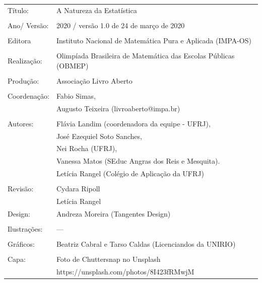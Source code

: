 \begin{tabular}{p{}p{}}
Título: & A Natureza da Estatística\\
\\
Ano/ Versão: & 2020 / versão 1.0 de 24 de março de 2020\\
\\
Editora & Instituto Nacional de Matem\'atica Pura e Aplicada (IMPA-OS)\\
\\
Realização:& Olimp\'iada Brasileira de Matem\'atica das Escolas P\'ublicas (OBMEP)\\
\\
Produção:& Associação Livro Aberto\\
\\
Coordenação: & Fabio Simas, \\
             & Augusto Teixeira (livroaberto@impa.br)\\
\\
  Autores: & Flávia Landim (coordenadora da equipe - UFRJ),\\
        & José Ezequiel Soto Sanches,\\
        & Nei Rocha (UFRJ),\\
             & Vanessa Matos (SEduc Angras dos Reis e Mesquita).\\
             & Letícia Rangel (Colégio de Aplicação da UFRJ)\\
\\
Revisão: &  Cydara Ripoll  \\
		 &  Letícia Rangel
\\
Design: & Andreza Moreira (Tangentes Design) \\
\\
  Ilustrações: & --- \\ 
\\
Gráficos: & Beatriz Cabral e Tarso Caldas (Licenciandos da UNIRIO)\\
\\
  Capa: & Foto de Chuttersnap no Unsplash \\
        & https://unsplash.com/photos/8I423fRMwjM \\

\end{tabular}



